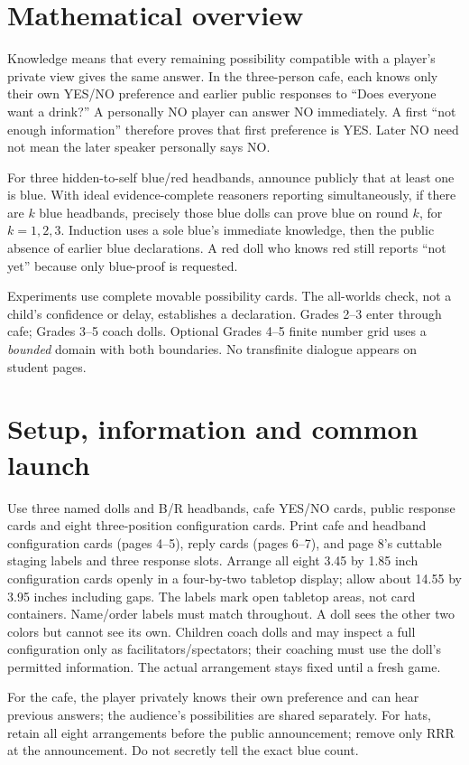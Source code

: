 \documentclass[11pt,letterpaper]{article}
\begin{document}
\section*{Mathematical overview}
Knowledge means that every remaining possibility compatible with a player's private view gives the same answer. In the three-person cafe, each knows only their own YES/NO preference and earlier public responses to ``Does everyone want a drink?'' A personally NO player can answer NO immediately. A first ``not enough information'' therefore proves that first preference is YES. Later NO need not mean the later speaker personally says NO.

For three hidden-to-self blue/red headbands, announce publicly that at least one is blue. With ideal evidence-complete reasoners reporting simultaneously, if there are $k$ blue headbands, precisely those blue dolls can prove blue on round $k$, for $k=1,2,3$. Induction uses a sole blue's immediate knowledge, then the public absence of earlier blue declarations. A red doll who knows red still reports ``not yet'' because only blue-proof is requested.

Experiments use complete movable possibility cards. The all-worlds check, not a child's confidence or delay, establishes a declaration. Grades 2--3 enter through cafe; Grades 3--5 coach dolls. Optional Grades 4--5 finite number grid uses a \emph{bounded} domain with both boundaries. No transfinite dialogue appears on student pages.
\newpage
\section*{Setup, information and common launch}
Use three named dolls and B/R headbands, cafe YES/NO cards, public response cards and eight three-position configuration cards. Print cafe and headband configuration cards (pages 4--5), reply cards (pages 6--7), and page 8's cuttable staging labels and three response slots. Arrange all eight 3.45 by 1.85 inch configuration cards openly in a four-by-two tabletop display; allow about 14.55 by 3.95 inches including gaps. The labels mark open tabletop areas, not card containers. Name/order labels must match throughout. A doll sees the other two colors but cannot see its own. Children coach dolls and may inspect a full configuration only as facilitators/spectators; their coaching must use the doll's permitted information. The actual arrangement stays fixed until a fresh game.

For the cafe, the player privately knows their own preference and can hear previous answers; the audience's possibilities are shared separately. For hats, retain all eight arrangements before the public announcement; remove only RRR at the announcement. Do not secretly tell the exact blue count.
\end{document}
